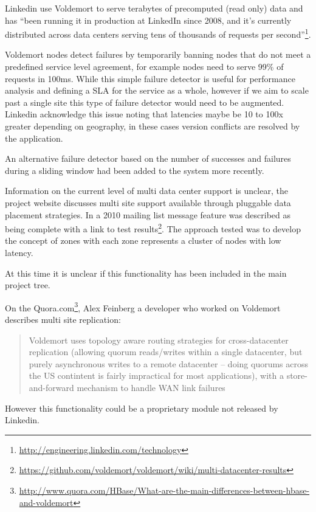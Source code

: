 Linkedin use Voldemort to serve terabytes of precomputed (read only) data  and has “been running it in production at LinkedIn since 2008, and it’s currently distributed across data centers serving tens of thousands of requests per second”\footnote{\url{http://engineering.linkedin.com/technology}}.

Voldemort nodes detect failures by temporarily banning nodes that do not meet a predefined service level agreement, for example nodes need to serve 99\% of requests in 100ms\cite{voldemortSLA}. While this simple failure detector is useful for performance analysis and defining a SLA for the service as a whole, however if we aim to scale past a single site this type of failure detector would need to be augmented. Linkedin acknowledge this issue\cite{voldemortSLA} noting that latencies maybe be 10 to 100x greater depending on geography, in these cases version conflicts are resolved by the application.

An alternative failure detector based on the number of successes and failures during a sliding window had been added to the system more recently.

Information on the current level of multi data center support is unclear, the project website discusses multi site support available through pluggable data placement strategies. In a 2010 mailing list message feature was described as being complete with a link to test results\footnote{\url{https://github.com/voldemort/voldemort/wiki/multi-datacenter-results}}. The approach tested was to develop the concept of zones with each zone represents a cluster of nodes with low latency.

At this time it is unclear if this functionality has been included in the main project tree.

On the Quora.com\footnote{\url{http://www.quora.com/HBase/What-are-the-main-differences-between-hbase-and-voldemort}}, Alex Feinberg a developer who worked on Voldemort describes multi site replication:
\begin{quote}
 Voldemort uses topology aware routing strategies for cross-datacenter replication (allowing quorum reads/writes within a single datacenter, but purely asynchronous writes to a remote datacenter -- doing quorums across the US contintent is fairly impractical for most applications), with a store-and-forward mechanism to handle WAN link failures
\end{quote}
However this functionality could be a proprietary module not released by Linkedin.


